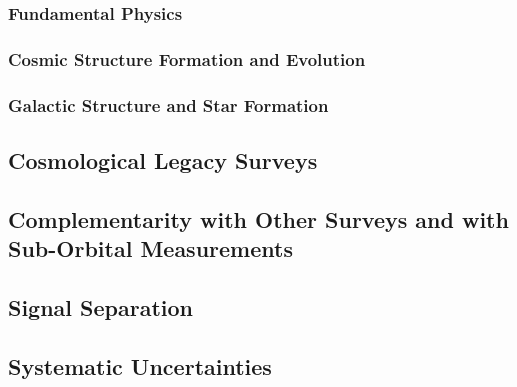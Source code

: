 \documentclass[12pt]{article}
\begin{document}
\subsubsection{Fundamental Physics} %
\label{sec:fundamentalsci}





\subsubsection{Cosmic Structure Formation and Evolution} %
\label{sec:extragalacticsci}



\subsubsection{Galactic Structure and Star Formation} %
\label{sec:galacticsci}



\subsection{Cosmological Legacy Surveys} %





\subsection{Complementarity with Other Surveys and with Sub-Orbital Measurements} %




\subsection{Signal Separation}%
\label{sec:signal_separation}




\subsection{Systematic Uncertainties}%
\end{document}
